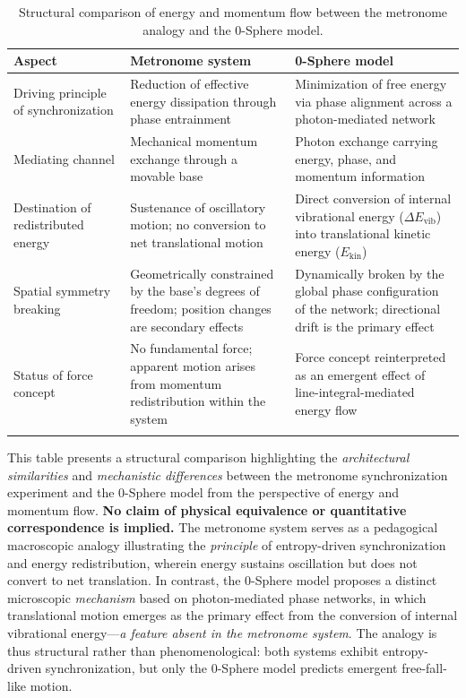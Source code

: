 \documentclass[%
 reprint,
 amsmath,amssymb,
 aps,
 prb,
]{revtex4-2}
\numberwithin{equation}{section}
\begin{document}
\begin{table}[th!]
\centering
\caption{Structural comparison of energy and momentum flow between the metronome analogy and the 0-Sphere model.}
\label{tab:metronome_vs_0sphere_energy_flow}
\renewcommand{\arraystretch}{1.4}
\begin{tabular}{p{5.0cm}p{6.0cm}p{6.0cm}}
\toprule
\textbf{Aspect} & \textbf{Metronome system} & \textbf{0-Sphere model} \\
\midrule
Driving principle of synchronization
& Reduction of effective energy dissipation through phase entrainment
& Minimization of free energy via phase alignment across a photon-mediated network \\
\addlinespace[0.25cm]
Mediating channel
& Mechanical momentum exchange through a movable base
& Photon exchange carrying energy, phase, and momentum information \\
\addlinespace[0.25cm]
Destination of redistributed energy
& Sustenance of oscillatory motion; no conversion to net translational motion
& Direct conversion of internal vibrational energy ($\Delta E_\text{vib}$) into translational kinetic energy ($E_\text{kin}$) \\
\addlinespace[0.25cm]
Spatial symmetry breaking
& Geometrically constrained by the base's degrees of freedom; position changes are secondary effects
& Dynamically broken by the global phase configuration of the network; directional drift is the primary effect \\
\addlinespace[0.25cm]
Status of force concept
& No fundamental force; apparent motion arises from momentum redistribution within the system
& Force concept reinterpreted as an emergent effect of line-integral-mediated energy flow \\
\addlinespace[0.20cm]
\bottomrule
\end{tabular}
\vspace{0.4em}
\begin{minipage}{0.95\textwidth}
\justifying\small
This table presents a structural comparison highlighting the \textit{architectural similarities} and \textit{mechanistic differences} between the metronome synchronization experiment and the 0-Sphere model from the perspective of energy and momentum flow. \textbf{No claim of physical equivalence or quantitative correspondence is implied.} The metronome system serves as a pedagogical macroscopic analogy illustrating the \textit{principle} of entropy-driven synchronization and energy redistribution, wherein energy sustains oscillation but does not convert to net translation. In contrast, the 0-Sphere model proposes a distinct microscopic \textit{mechanism} based on photon-mediated phase networks, in which translational motion emerges as the primary effect from the conversion of internal vibrational energy—\textit{a feature absent in the metronome system}. The analogy is thus structural rather than phenomenological: both systems exhibit entropy-driven synchronization, but only the 0-Sphere model predicts emergent free-fall-like motion.
\end{minipage}
\end{table}
\end{document}
